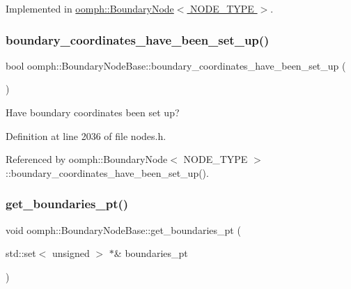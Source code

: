 Implemented in \hyperlink{classoomph_1_1BoundaryNode_a04ba9bf0b13ec5a8da2e2a27d41a1ef5}{oomph\+::\+Boundary\+Node$<$ N\+O\+D\+E\+\_\+\+T\+Y\+P\+E $>$}.

\mbox{\label{classoomph_1_1BoundaryNodeBase_a5f40147dddc319bcde0e26239e2fb813}} 
\subsubsection{\texorpdfstring{boundary\+\_\+coordinates\+\_\+have\+\_\+been\+\_\+set\+\_\+up()}{boundary\_coordinates\_have\_been\_set\_up()}}
{\footnotesize\ttfamily bool oomph\+::\+Boundary\+Node\+Base\+::boundary\+\_\+coordinates\+\_\+have\+\_\+been\+\_\+set\+\_\+up (\begin{DoxyParamCaption}{ }\end{DoxyParamCaption})\hspace{0.3cm}{\ttfamily [inline]}}



Have boundary coordinates been set up? 



Definition at line 2036 of file nodes.\+h.



Referenced by oomph\+::\+Boundary\+Node$<$ N\+O\+D\+E\+\_\+\+T\+Y\+P\+E $>$\+::boundary\+\_\+coordinates\+\_\+have\+\_\+been\+\_\+set\+\_\+up().

\mbox{\label{classoomph_1_1BoundaryNodeBase_a29342ee40e695be4300b09920456073c}} 
\subsubsection{\texorpdfstring{get\+\_\+boundaries\+\_\+pt()}{get\_boundaries\_pt()}}
{\footnotesize\ttfamily void oomph\+::\+Boundary\+Node\+Base\+::get\+\_\+boundaries\+\_\+pt (\begin{DoxyParamCaption}\item[{std\+::set$<$ unsigned $>$ $\ast$\&}]{boundaries\+\_\+pt }\end{DoxyParamCaption})\hspace{0.3cm}{\ttfamily [inline]}}



